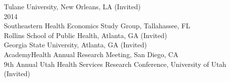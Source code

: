 \documentclass[9pt]{article}
\newenvironment{changemargin}[2]{%
  \begin{list}{}{%
    \setlength{\topsep}{0pt}%
    \setlength{\leftmargin}{#1}%
    \setlength{\rightmargin}{#2}%
    \setlength{\listparindent}{\parindent}%
    \setlength{\itemindent}{\parindent}%
    \setlength{\parsep}{\parskip}%
  }%
  \item[]}{\end{list}
}
\newenvironment{body} {
	\vspace*{-16pt}
	\begin{changemargin}{-0.25in}{-0.5in}
  }	
	{\end{changemargin}
}
\begin{document}
\begin{body}
  Tulane University, New Orleans, LA (Invited) \\
  \hspace{-.2in} 2014 \\
  Southeastern Health Economics Study Group, Tallahassee, FL \\
  Rollins School of Public Health, Atlanta, GA (Invited)  \\
  Georgia State University, Atlanta, GA (Invited) \\
  AcademyHealth Annual Research Meeting, San Diego, CA  \\
  9th Annual Utah Health Services Research Conference, University of Utah (Invited) \\
\end{body}
\smallskip


\end{document}
